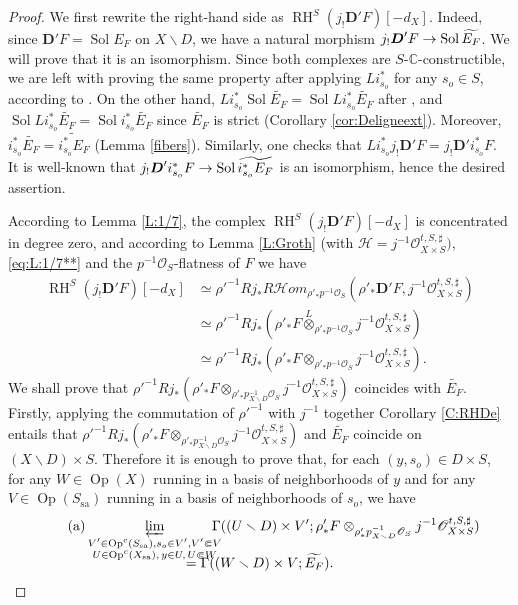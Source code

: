 \documentclass[english]{smfart}
\numberwithin{subsection}{section}
\def\shh{\mathcal{H}}
\def\shh{\mathcal{H}}
\def\sho{\mathcal{O}}\let\cO\sho
\newcommand{\C}{\mathbb{C}}\let\CC\C
\newcommand{\bD}{\boldsymbol{D}}
\newcommand{\shhom}{\mathcal{H}\!\mathit{om}}\let\ho\shhom
\DeclareMathOperator{\RH}{RH}
\newcommand{\sa}{\mathrm{sa}}
\newcommand{\XS}{X\times S}
\DeclareMathOperator{\Op}{Op}
\DeclareMathOperator{\Sol}{Sol}
\let\tilde\widetilde
\let\wt\widetilde
\let\setminus\smallsetminus
\let\moins\smallsetminus
\newcommand{\pOS}{p^{-1}\sho_S}
\numberwithin{equation}{section}
\theoremstyle{plain}
\theoremstyle{definition}
\def\to{\mathchoice{\longrightarrow}{\rightarrow}{\rightarrow}{\rightarrow}}
\begin{document}
\begin{proof}
We first rewrite the right-hand side as $\RH^S(j_!\bD'F)[-d_X]$. Indeed, since $\bD'F=\Sol E_F$ on $X\moins D$, we have a natural morphism $j_!\bD'F\to\Sol\wt{E_F}$. We will prove that it is an isomorphism. Since both complexes are $S$-$\C$-constructible, we are left with proving the same property after applying $Li_{s_o}^*$ for any $s_o\in S$, according to \cite[Prop.\,2.2]{MF-S12}. On the other hand, $Li_{s_o}^*\Sol\wt{E_F}=\Sol Li_{s_o}^*\wt{E_F}$ after \cite[Prop.\,2.1]{MF-S12}, and $\Sol Li_{s_o}^*\wt{E_F}=\Sol i_{s_o}^*\wt{E_F}$ since $\wt{E_F}$ is strict (Corollary \ref{cor:Deligneext}). Moreover, $i_{s_o}^*\wt{E_F}=\wt{i_{s_o}^*E_F}$ (Lemma \ref{fibers}). Similarly, one checks that $Li_{s_o}^*j_!\bD'F=j_!\bD'i_{s_o}^*F$. It is well-known that $j_!\bD'i_{s_o}^*F\to\Sol\wt {i_{s_o}^*E_F}$ is an isomorphism, hence the desired assertion.

According to Lemma \ref{L:1/7}, the complex $\RH^S(j_!\bD'F)[-d_X]$ is concentrated in degree zero, and according to Lemma \ref{L:Groth} (with $\shh= j^{-1}\sho^{t, S,\sharp}_{\XS})$, \eqref{eq:L:1/7**} and the $\pOS$-flatness of $F$ we have
\begin{align*}
\RH^S(j_!\bD'F)[-d_X]&\simeq
\rho'^{-1}Rj_*R\shhom_{\rho'_*\pOS}(\rho'_*\bD'F, j^{-1}\sho^{t, S,\sharp}_{\XS})\\
&\simeq
\rho'^{-1}Rj_*(\rho'_*F\overset{L}\otimes_{\rho'_*\pOS} j^{-1}\sho^{t, S,\sharp}_{\XS})\\
&\simeq
\rho'^{-1}Rj_*(\rho'_*F\otimes_{\rho'_*\pOS} j^{-1}\sho^{t, S,\sharp}_{\XS}).
\end{align*}
We shall prove that $\rho'^{-1}Rj_*(\rho'_*F{\otimes}_{\rho'_*p_{X\setminus D}^{-1}\sho_S} j^{-1}\sho^{t, S,\sharp}_{\XS})$ coincides with $\tilde{E_F}$. Firstly, applying the commutation of $\rho'^{-1}$ with $j^{-1}$ together Corollary \ref{C:RHDe} entails that $\rho'^{-1}Rj_*(\rho'_*F{\otimes}_{\rho'_*p_{X\setminus D}^{-1}\sho_S} j^{-1}\sho^{t, S,\sharp}_{\XS})$ and $\tilde{E_F}$ coincide on $(X\setminus D)\times S$. Therefore it is enough to prove that, for each $(y,s_o)\in D\times S$, for any $W\in \Op(X)$ running in a basis of neighborhoods of $y$ and for any $V\in\Op(S_{\sa})$ running in a basis of neighborhoods of $s_o$, we have
\begin{multline*}
\tag{a}
\varprojlim_{\substack{{V'\in \Op^c(S_{\sa}), s_o\in V',V'\Subset V}\\{U\in \Op^c(X_{\sa}),\,y\in U, \,U\Subset W}}}\hspace*{-3mm}
\Gamma((U\setminus D)\times V'; \rho'_*F\otimes_{\rho'_*p_{X\setminus D}^{-1}\sho_S} j^{-1}\sho^{t, S,\sharp}_{\XS})\\[-10pt]
= \Gamma((W\setminus D)\times V; \tilde{E_F}).
\end{multline*}


\end{proof}
\end{document}
